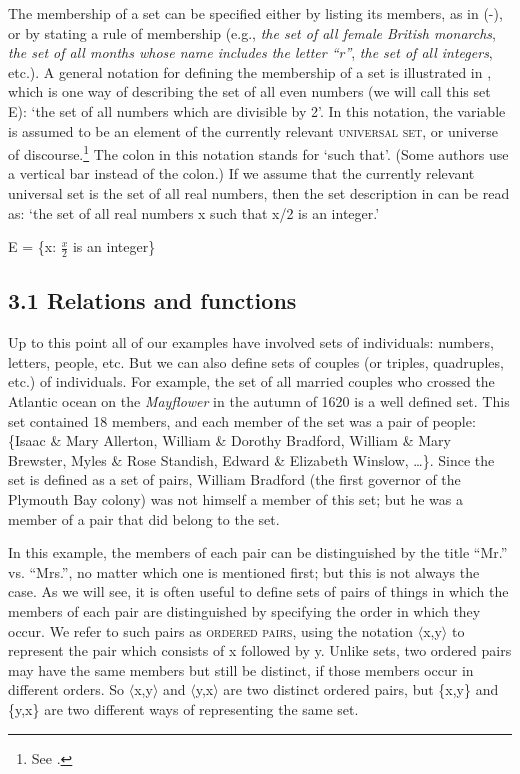 The membership of a set can be specified either by listing its members, as in (-), or by stating a rule of membership (e.g., \textit{the set of all female British monarchs}, \textit{the set of all months whose name includes the letter “r”}, \textit{the set of all integers}, etc.). A general notation for defining the membership of a set is illustrated in , which is one way of describing the set of all even numbers (we will call this set E): ‘the set of all numbers which are divisible by 2’. In this notation, the variable is assumed to be an element of the currently relevant \textsc{universal set}, or universe of discourse.\footnote{See .} The colon in this notation stands for ‘such that’. (Some authors use a vertical bar {\textbar} instead of the colon.) If we assume that the currently relevant universal set is the set of all real numbers, then the set description in  can be read as: ‘the set of all real numbers x such that x/2 is an integer.’


\ea
E = \{x: $\frac{x}{2}$ is an integer\}
\z

\subsection{3.1  Relations and functions}\label{sec:}

Up to this point all of our examples have involved sets of individuals: numbers, letters, people, etc. But we can also define sets of couples (or triples, quadruples, etc.) of individuals. For example, the set of all married couples who crossed the Atlantic ocean on the \textit{Mayflower} in the autumn of 1620 is a well defined set. This set contained 18 members, and each member of the set was a pair of people: \{Isaac \& Mary Allerton, William \& Dorothy Bradford, William \& Mary Brewster, Myles \& Rose Standish, Edward \& Elizabeth Winslow, …\}. Since the set is defined as a set of pairs, William Bradford (the first governor of the Plymouth Bay colony) was not himself a member of this set; but he was a member of a pair that did belong to the set.



In this example, the members of each pair can be distinguished by the title “Mr.” vs. “Mrs.”, no matter which one is mentioned first; but this is not always the case. As we will see, it is often useful to define sets of pairs of things in which the members of each pair are distinguished by specifying the order in which they occur. We refer to such pairs as \textsc{ordered pairs}, using the notation $\langle$x,y$\rangle$ to represent the pair which consists of x followed by y. Unlike sets, two ordered pairs may have the same members but still be distinct, if those members occur in different orders. So $\langle$x,y$\rangle$ and $\langle$y,x$\rangle$ are two distinct ordered pairs, but \{x,y\} and \{y,x\} are two different ways of representing the same set.




